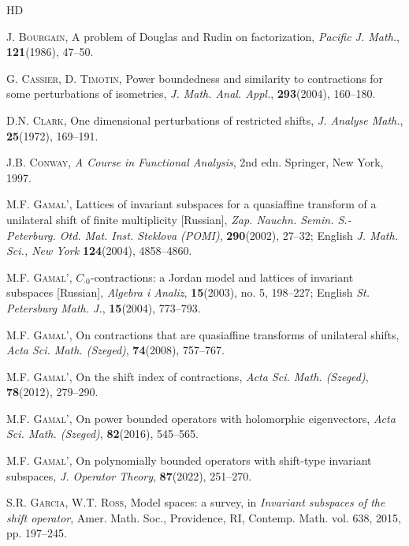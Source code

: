 \documentclass[a4paper,oneside,11pt]{amsart}
\numberwithin{equation}{section}
\theoremstyle{plain}
\theoremstyle{definition}
\begin{document}
\begin{thebibliography}{HD}


\normalsize
\baselineskip=11pt

   \textsc{J. Bourgain}, A problem of Douglas and Rudin on factorization, \textit{Pacific J. Math.},  \textbf{121}(1986), 47--50.

   \textsc{G. Cassier, D. Timotin}, Power boundedness and similarity to contractions for some perturbations of isometries, \textit{J. Math. Anal. Appl.}, \textbf{293}(2004),  160--180. 

   \textsc{D.N. Clark}, One dimensional perturbations of restricted shifts, \textit{J. Analyse Math.},   \textbf{25}(1972),      169--191.  

   \textsc{J.B. Conway},  \textit{A Course in Functional Analysis}, 2nd edn. Springer, New York, 1997.

  \textsc{M.F. Gamal'},  Lattices of invariant subspaces for a quasiaffine transform of a unilateral shift of finite multiplicity 
 [Russian], 
\textit{Zap. Nauchn. Semin. S.- Peterburg. Otd. Mat. Inst. Steklova (POMI)},  \textbf{290}(2002), 27--32; 
 English \textit{J. Math. Sci., New York}  \textbf{124}(2004), 4858--4860.

  \textsc{M.F. Gamal'},  
$C_{\cdot 0}$-contractions: a Jordan model and lattices of invariant subspaces  [Russian],  
 \textit{Algebra i Analiz},  \textbf{15}(2003), no. 5, 198--227; 
English   \textit{St. Petersburg Math. J.},  \textbf{15}(2004), 773--793.

 \textsc{M.F. Gamal'}, On contractions that are quasiaffine transforms of unilateral shifts, 
\textit{Acta Sci. Math. (Szeged)},   \textbf{74}(2008), 757--767.

 \textsc{M.F. Gamal'}, On the shift index of contractions, \textit{Acta Sci. Math. (Szeged)},   \textbf{78}(2012), 279--290.

  \textsc{M.F. Gamal'},  On power bounded operators with holomorphic eigenvectors, 
\textit{Acta Sci. Math. (Szeged)},   \textbf{82}(2016), 545--565.

  \textsc{M.F. Gamal'},  On polynomially bounded operators with shift-type invariant subspaces, 
 \textit{J. Operator Theory},  \textbf{87}(2022),  251--270.

 \textsc{S.R. Garcia,  W.T. Ross}, Model spaces: a survey, in
 \emph{Invariant subspaces of the shift operator}, Amer. Math. Soc., Providence, RI, Contemp. Math. vol. 638, 2015, pp.   
 197--245. 


\end{thebibliography}
\end{document}
